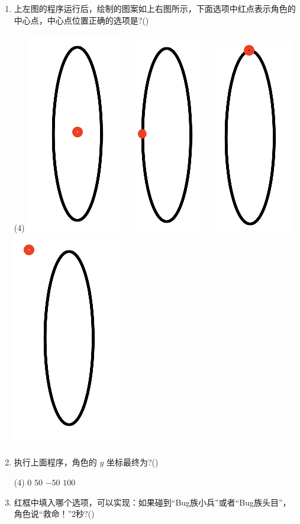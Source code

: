 \documentclass[10pt, a4paper]{article}
\begin{document}
\begin{enumerate}
        \item 上左图的程序运行后，绘制的图案如上右图所示，下面选项中红点表示角色的中心点，中心点位置正确的选项是?(\qquad)
        \begin{tasks}(4)
            \task \includegraphics[width=.08\textwidth]{14a.png}
            \task \includegraphics[width=.065\textwidth]{14b.png}
            \task \includegraphics[width=.07\textwidth]{14c.png}
            \task \includegraphics[width=.09\textwidth]{14d.png}
        \end{tasks}

        \item 执行上面程序，角色的 $y$ 坐标最终为?(\qquad)
        \begin{tasks}(4)
            \task $0$
            \task $50$
            \task $-50$
            \task $100$
        \end{tasks}

        \item 红框中填入哪个选项，可以实现：如果碰到“Bug族小兵”或者“Bug族头目”，角色说“救命！”2秒?(\qquad)
        

\end{enumerate}
\end{document}
